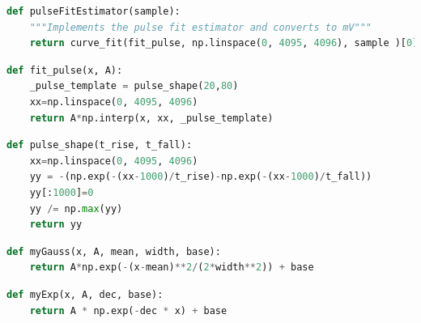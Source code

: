 \documentclass[
	letterpaper, %
	10pt, %
]{template}
\begin{document}
\begin{lstlisting}[caption={\label{lst-6}Implementation of  \textbf{\hyperref[est-6]{Estimator 6}}},captionpos=b,language=python]
def pulseFitEstimator(sample):
    """Implements the pulse fit estimator and converts to mV"""
    return curve_fit(fit_pulse, np.linspace(0, 4095, 4096), sample )[0] * 1000
\end{lstlisting}
\begin{lstlisting}[caption={\label{lst-7} Function used in the fitting process for \textbf{\hyperref[est-6]{Estimator 6}} uses \textbf{\hyperref[lst-8]{Function 8}} as theoretical model}  model,captionpos=b,language=python]
def fit_pulse(x, A):
    _pulse_template = pulse_shape(20,80)
    xx=np.linspace(0, 4095, 4096)
    return A*np.interp(x, xx, _pulse_template)
\end{lstlisting}
\begin{lstlisting}[caption={\label{lst-8} Python implementation of \textbf{\hyperref[eqn-1]{Equation 1}}},
captionpos=b,language=python]
def pulse_shape(t_rise, t_fall):
    xx=np.linspace(0, 4095, 4096)
    yy = -(np.exp(-(xx-1000)/t_rise)-np.exp(-(xx-1000)/t_fall))
    yy[:1000]=0
    yy /= np.max(yy)
    return yy
\end{lstlisting}
\begin{lstlisting}[caption={\label{lst-9}Implementation of gaussian distribution used to fit the calibration data},captionpos=b,language=python]
def myGauss(x, A, mean, width, base):
    return A*np.exp(-(x-mean)**2/(2*width**2)) + base
\end{lstlisting}
\begin{lstlisting}[caption={\label{lst-10}Implementation of exponential decay used to fit the calibration data},captionpos=b,language=python]
def myExp(x, A, dec, base):
    return A * np.exp(-dec * x) + base
\end{lstlisting}



\end{document}
